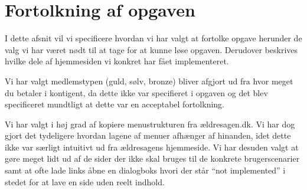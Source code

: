 \section{Fortolkning af opgaven}

I dette afsnit vil vi specificere hvordan vi har valgt at fortolke opgave
herunder de valg vi har været nødt til at tage for at kunne løse opgaven.
Derudover beskrives hvilke dele af hjemmesiden vi konkret har fået
implementeret.

Vi har valgt medlemstypen (guld, sølv, bronze) bliver afgjort ud fra hvor meget
du betaler i kontigent, da dette ikke var specifieret i opgaven og det blev
specificeret mundtligt at dette var en acceptabel fortolkning.

Vi har valgt i høj grad af kopiere menustrukturen fra ældresagen.dk. Vi har
dog gjort det tydeligere hvordan lagene af menuer afhænger af hinanden, idet
dette ikke var særligt intuitivt ud fra ældresagens hjemmeside. Vi har desuden
valgt at gøre meget lidt ud af de sider der ikke skal bruges til de konkrete
brugerscenarier samt at ofte lade links åbne en dialogboks hvori der står
``not implemented'' i stedet for at lave en side uden reelt indhold.
